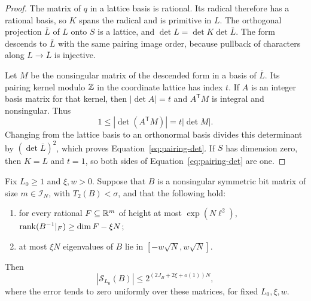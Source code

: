 \begin{proof}
The matrix of \(q\) in a lattice basis is rational. Its radical
therefore has a rational basis, so \(K\) spans the radical and is
primitive in \(L\). The orthogonal projection \(\bar L\) of
\(L\) onto \(S\) is a lattice, and
\(\det L=\det K\det\bar L\). The form descends to \(\bar L\)
with the same pairing image order, because pullback of characters
along \(L\to\bar L\) is injective.

Let \(M\) be the nonsingular matrix of the descended form in a
basis of \(\bar L\). Its pairing kernel modulo \(\mathbb Z\) in the
coordinate lattice has index \(t\). If \(A\) is an integer basis
matrix for that kernel, then \(|\det A|=t\) and
\(A^{\mathsf T}M\) is integral and nonsingular. Thus
\[
 1\le|\det(A^{\mathsf T}M)|=t|\det M|.
\]
Changing from the lattice basis to an orthonormal basis divides
this determinant by \((\det\bar L)^2\), which proves
Equation~\eqref{eq:pairing-det}. If \(S\) has dimension zero, then \(K=L\) and \(t=1\),
so both sides of Equation~\eqref{eq:pairing-det} are one.
\end{proof}


\begin{lemma}\label{lem:graph-comparison}
Fix \(L_0\ge1\) and \(\xi,w>0\). Suppose that \(B\) is a
nonsingular symmetric bit matrix of size \(m\in\mathcal I_N\),
with \(T_2(B)<\sigma\), and that the following hold:
\begin{enumerate}[label=\textup{(\roman*)}]
 \item for every rational \(F\subseteq\mathbb R^m\) of height at most
 \(\exp(N\ell^2)\),
 \(\operatorname{rank}(B^{-1}|_F)\ge\dim F-\xi N\);
 \item at most \(\xi N\) eigenvalues of \(B\) lie in
 \([-w\sqrt N,w\sqrt N]\).
\end{enumerate}
Then
\[
 |\mathcal S_{L_0}(B)|\le 2^{(2J_B+2\xi+o(1))N},
\]
where the error tends to zero uniformly over these matrices, for
fixed \(L_0,\xi,w\).
\end{lemma}

